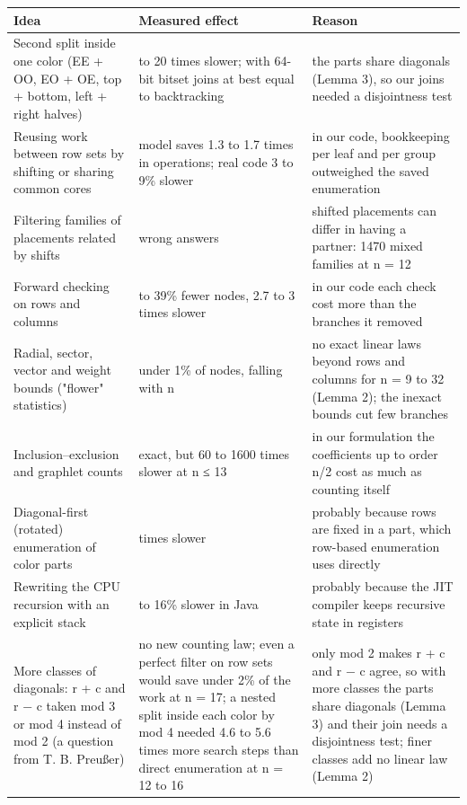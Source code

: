 \begin{table}[htbp]\centering\small
\begin{tabularx}{\textwidth}{>{\raggedright\arraybackslash}p{}>{\raggedright\arraybackslash}X>{\raggedright\arraybackslash}X}\toprule
Idea & Measured effect & Reason \\\midrule
Second split inside one color (EE + OO, EO + OE, top + bottom, left + right halves) & 1.7 to 20 times slower; with 64-bit bitset joins at best equal to backtracking & the parts share diagonals (Lemma 3), so our joins needed a disjointness test \\
Reusing work between row sets by shifting or sharing common cores & model saves 1.3 to 1.7 times in operations; real code 3 to 9\% slower & in our code, bookkeeping per leaf and per group outweighed the saved enumeration \\
Filtering families of placements related by shifts & wrong answers & shifted placements can differ in having a partner: 1470 mixed families at n = 12 \\
Forward checking on rows and columns & 22 to 39\% fewer nodes, 2.7 to 3 times slower & in our code each check cost more than the branches it removed \\
Radial, sector, vector and weight bounds ("flower" statistics) & under 1\% of nodes, falling with n & no exact linear laws beyond rows and columns for n = 9 to 32 (Lemma 2); the inexact bounds cut few branches \\
Inclusion–exclusion and graphlet counts & exact, but 60 to 1600 times slower at n ≤ 13 & in our formulation the coefficients up to order n/2 cost as much as counting itself \\
Diagonal-first (rotated) enumeration of color parts & 7 times slower & probably because rows are fixed in a part, which row-based enumeration uses directly \\
Rewriting the CPU recursion with an explicit stack & 7 to 16\% slower in Java & probably because the JIT compiler keeps recursive state in registers \\
More classes of diagonals: r + c and r − c taken mod 3 or mod 4 instead of mod 2 (a question from T. B. Preußer) & no new counting law; even a perfect filter on row sets would save under 2\% of the work at n = 17; a nested split inside each color by mod 4 needed 4.6 to 5.6 times more search steps than direct enumeration at n = 12 to 16 & only mod 2 makes r + c and r − c agree, so with more classes the parts share diagonals (Lemma 3) and their join needs a disjointness test; finer classes add no linear law (Lemma 2) \\
\bottomrule
\end{tabularx}
\end{table}

